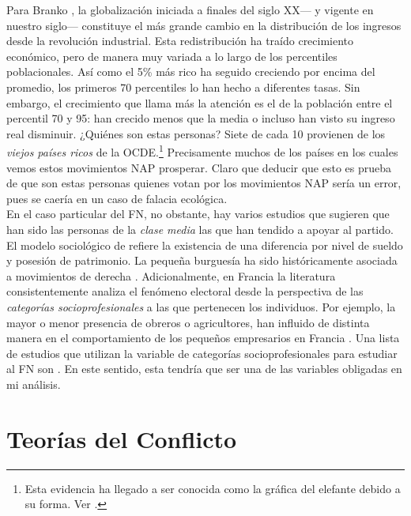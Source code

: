 Para Branko \textcite{Milanovic16}, la globalización iniciada a finales del siglo XX--- y vigente en nuestro siglo--- constituye el más grande cambio en la distribución de los ingresos desde la revolución industrial. Esta redistribución ha traído crecimiento económico, pero de manera muy variada a lo largo de los percentiles poblacionales. Así como el 5\% más rico ha seguido creciendo por encima del promedio, los primeros 70 percentiles lo han hecho a diferentes tasas. Sin embargo, el crecimiento que llama más la atención es el de la población entre el percentil 70 y 95: han crecido menos que la media o incluso han visto su ingreso real disminuir. ¿Quiénes son estas personas? Siete de cada 10 provienen de los \textit{viejos países ricos} de la OCDE.\footnote{Esta evidencia ha llegado a ser conocida como la gráfica del elefante debido a su forma. Ver \textcite{Milanovic16}.} Precisamente muchos de los países en los cuales vemos estos movimientos NAP prosperar. Claro que deducir que esto es prueba de que son estas personas quienes votan por los movimientos NAP sería un error, pues se caería en un caso de falacia ecológica.\\

En el caso particular del FN, no obstante, hay varios estudios que sugieren que han sido las personas de la \textit{clase media} las que han tendido a apoyar al partido. El modelo sociológico de \textcite{MayerPerrineau90} refiere la existencia de una diferencia por nivel de sueldo y posesión de patrimonio. La pequeña burguesía ha sido históricamente asociada a movimientos de derecha \parencites{Mayer87}{LeBras15}{Goodliffe19}. Adicionalmente, en Francia la literatura consistentemente analiza el fenómeno electoral desde la perspectiva de las \textit{categorías socioprofesionales} a las que pertenecen los individuos. Por ejemplo, la mayor o menor presencia de obreros o agricultores, han influido de distinta manera en el comportamiento de los pequeños empresarios en Francia \parencite{MayerMichelat81}. Una lista de estudios que utilizan la variable de categorías socioprofesionales para estudiar al FN son \textcites{Mayer87}{Mayer05}{Mayer07}{MayerPerrineau90}{MayerBoy97}{Perrineau99}{Perrineau07}{Perrineau12}{Gombin05}{Gombin09}{Gombin13}{Gombin13b}{Riviere12}{GombinRiviere13}. En este sentido, esta tendría que ser una de las variables obligadas en mi análisis.

\section{Teorías del Conflicto}

